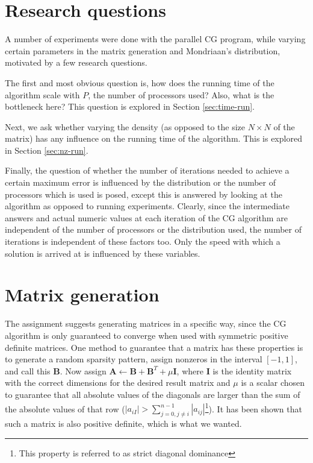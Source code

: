 \documentclass[a4paper]{article}
\newcommand{\mat}[1]{\ensuremath{\boldsymbol{#1}}}
\begin{document}
\section{Research questions}

A number of experiments were done with the parallel CG program, while
varying certain parameters in the matrix generation and Mondriaan's distribution,
motivated by a few research questions.

The first and most obvious question is, how does the running time of the algorithm
scale with $P$, the number of processors used? Also, what is the
bottleneck here? This question is explored in Section
\ref{sec:time-run}.

Next, we ask whether varying the density (as opposed to the size $N\times N$ of the matrix) has
any influence on the running time of the algorithm. This is explored in Section \ref{sec:nz-run}.

Finally, the question of whether the number of iterations needed to achieve a certain maximum
error is influenced by the distribution or the number of processors which is used is posed, except
this is answered by looking at the algorithm as opposed to running experiments. Clearly, since the
intermediate answers and actual numeric values at each iteration of the CG algorithm are independent
of the number of processors or the distribution used, the number of iterations is independent of these
factors too. Only the speed with which a solution is arrived at is influenced by these variables.

\section{Matrix generation}\label{sec:matrix-generation}

The assignment suggests generating matrices in a specific way, since the CG
algorithm is only guaranteed to converge when used with symmetric positive
definite matrices. One method to guarantee that a matrix has these properties
is to generate a random sparsity pattern, assign nonzeros in the interval
$[-1,1]$, and call this \mat B.  Now assign $\mat A \leftarrow \mat B + \mat
B^T + \mu \mat I$, where \mat I is the identity matrix with the correct
dimensions for the desired result matrix and $\mu$ is a scalar chosen to
guarantee that all absolute values of the diagonals are larger than the sum of
the absolute values of that row ($|a_{iI}| > \sum_{j=0,j\neq i}^{n-1}
|a_{ij}|$\footnote{This property is referred to as strict diagonal dominance}).
It has been shown that such a matrix is also positive definite, which is what
we wanted.
\end{document}
